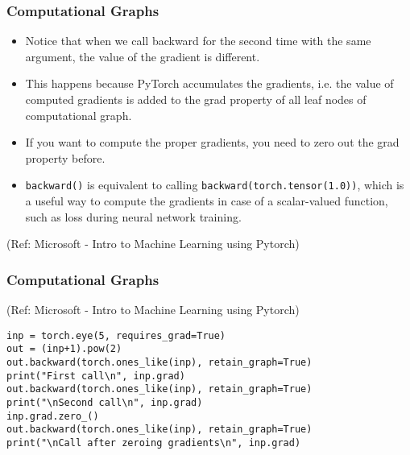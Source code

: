 \begin{frame}[fragile] \frametitle{Computational Graphs}

\begin{itemize}
\item Notice that when we call backward for the second time with the same argument, the value of the gradient is different. 
\item This happens because PyTorch accumulates the gradients, i.e. the value of computed gradients is added to the grad property of all leaf nodes of computational graph. 
\item If you want to compute the proper gradients, you need to zero out the grad property before. 
\item \lstinline|backward()| is equivalent to calling \lstinline|backward(torch.tensor(1.0))|, which is a useful way to compute the gradients in case of a scalar-valued function, such as loss during neural network training.
\end{itemize}


\tiny{(Ref: Microsoft - Intro to Machine Learning using Pytorch)}




\end{frame}

\begin{frame}[fragile] \frametitle{Computational Graphs}


\tiny{(Ref: Microsoft - Intro to Machine Learning using Pytorch)}

\begin{lstlisting}
inp = torch.eye(5, requires_grad=True)
out = (inp+1).pow(2)
out.backward(torch.ones_like(inp), retain_graph=True)
print("First call\n", inp.grad)
out.backward(torch.ones_like(inp), retain_graph=True)
print("\nSecond call\n", inp.grad)
inp.grad.zero_()
out.backward(torch.ones_like(inp), retain_graph=True)
print("\nCall after zeroing gradients\n", inp.grad)

\end{lstlisting}


\end{frame}


